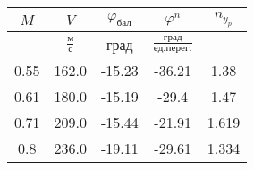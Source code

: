 \begin{tabular}{|c|c|c|c|c|}
\hline
$M$ & $V$ & $\varphi_{бал}$ & $\varphi^{n}$ & $n_{y_{p}}$ \\ 
\hline
- & $\frac{м}{с}$ & град & $\frac{град}{ед.перег.}$ & - \\ 
\hline
0.55 & 162.0 & -15.23 & -36.21 & 1.38 \\ 
\hline
0.61 & 180.0 & -15.19 & -29.4 & 1.47 \\ 
\hline
0.71 & 209.0 & -15.44 & -21.91 & 1.619 \\ 
\hline
0.8 & 236.0 & -19.11 & -29.61 & 1.334 \\ 
\hline
\end{tabular}